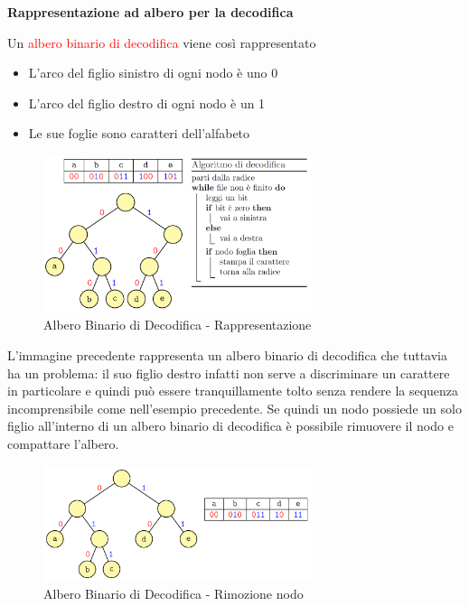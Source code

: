 \documentclass[../cheatSheetAlgoritmi.tex]{subfiles}
\begin{document}
\begin{flushleft}
\textbf{Rappresentazione ad albero per la decodifica}
\end{flushleft}
Un \textcolor{red}{albero binario di decodifica} viene così rappresentato
\begin{itemize}
	\item L'arco del figlio sinistro di ogni nodo è uno 0
	\item L'arco del figlio destro di ogni nodo è un 1
	\item Le sue foglie sono caratteri dell'alfabeto
\end{itemize}

\begin{figure}[h]
	\centering
	\includegraphics[width=0.7\textwidth]{../img/Greedy_2.png}
	\caption{Albero Binario di Decodifica - Rappresentazione}
\end{figure}

L'immagine precedente rappresenta un albero binario di decodifica che tuttavia ha un problema: il suo figlio destro infatti non serve a discriminare un carattere in particolare e quindi può essere tranquillamente tolto senza rendere la sequenza incomprensibile come nell'esempio precedente. Se quindi un nodo possiede un solo figlio all'interno di un albero binario di decodifica è possibile rimuovere il nodo e compattare l'albero.

\begin{figure}[h]
\centering
\includegraphics[width=0.7\textwidth]{../img/Greedy_3.png}
\caption{Albero Binario di Decodifica - Rimozione nodo}
\end{figure}
\end{document}
